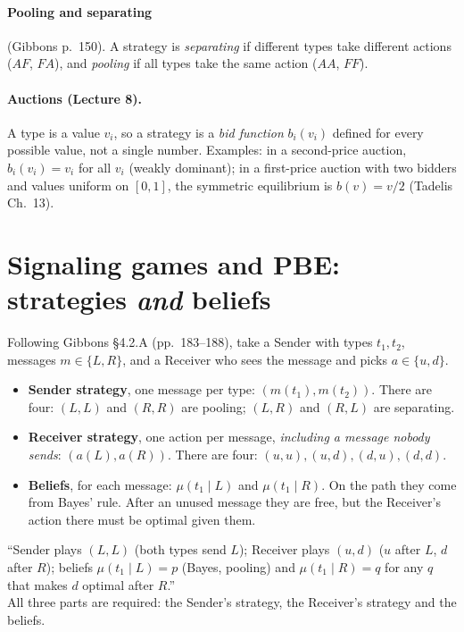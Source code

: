 \documentclass[11pt,a4paper]{article}
\begin{document}
\paragraph{Pooling and separating} (Gibbons p.~150). A strategy is \emph{separating} if different
types take different actions ($AF$, $FA$), and \emph{pooling} if all types take the same action
($AA$, $FF$).

\paragraph{Auctions (Lecture 8).} A type is a value $v_i$, so a strategy is a \emph{bid function}
$b_i(v_i)$ defined for every possible value, not a single number. Examples: in a second-price
auction, $b_i(v_i)=v_i$ for all $v_i$ (weakly dominant); in a first-price auction with two bidders
and values uniform on $[0,1]$, the symmetric equilibrium is $b(v)=v/2$ (Tadelis Ch.~13).

\section{Signaling games and PBE: strategies \emph{and} beliefs}

Following Gibbons §4.2.A (pp.~183--188), take a Sender with types $t_1,t_2$, messages $m\in\{L,R\}$,
and a Receiver who sees the message and picks $a\in\{u,d\}$.
\begin{itemize}
\item \textbf{Sender strategy}, one message per type: $(m(t_1),m(t_2))$. There are four:
$(L,L)$ and $(R,R)$ are pooling; $(L,R)$ and $(R,L)$ are separating.
\item \textbf{Receiver strategy}, one action per message, \emph{including a message nobody sends}:
$(a(L),a(R))$. There are four: $(u,u),(u,d),(d,u),(d,d)$.
\item \textbf{Beliefs}, for each message: $\mu(t_1\mid L)$ and $\mu(t_1\mid R)$. On the path they
come from Bayes' rule. After an unused message they are free, but the Receiver's action there
must be optimal given them.
\end{itemize}

\begin{tmpl}
``Sender plays $(L,L)$ (both types send $L$); Receiver plays $(u,d)$ ($u$ after $L$, $d$ after $R$);
beliefs $\mu(t_1\mid L)=p$ (Bayes, pooling) and $\mu(t_1\mid R)=q$ for any $q$ that makes $d$
optimal after $R$.''\\
All three parts are required: the Sender's strategy, the Receiver's strategy and the beliefs.
\end{tmpl}
\end{document}

